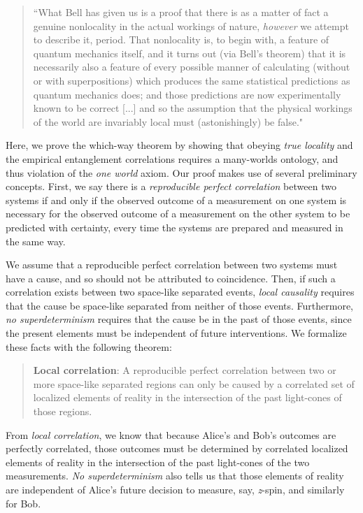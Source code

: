 \documentclass[12pt]{article}
\begin{document}
\begin{quote}
``What Bell has given us is a proof that there is as a matter of fact a genuine nonlocality in the actual workings of nature, \textit{however} we attempt to describe it, period. That nonlocality is, to begin with, a feature
of quantum mechanics itself, and it turns out (via Bell's theorem)
that it is necessarily also a feature of every possible manner of
calculating (without or with superpositions) which produces the
same statistical predictions as quantum mechanics does; and those
predictions are now experimentally known to be correct [...] and so the assumption
that the physical workings of the world are invariably local must
(astonishingly) be false." 
\end{quote}

Here, we prove the which-way theorem by showing that obeying \textit{true locality} and the empirical entanglement correlations requires a many-worlds ontology, and thus violation of the \textit{one world} axiom. Our proof makes use of several preliminary concepts.  First, we say there is a \textit{reproducible perfect correlation} between two systems if and only if the observed outcome of a measurement on one system is necessary for the observed outcome of a measurement on the other system to be predicted with certainty, every time the systems are prepared and measured in the same way.

We assume that a reproducible perfect correlation between two systems must have a cause, and so should not be attributed to coincidence.  Then, if such a correlation exists between two space-like separated events,  \textit{local causality} requires that the cause be space-like separated from neither of those events.  Furthermore, \textit{no superdeterminism} requires that the cause be in the past of those events, since the present elements must be independent of future interventions.  We formalize these facts with the following theorem:

\begin{quote}
\textbf{Local correlation}: A reproducible perfect correlation between two or more space-like separated regions can only be caused by a correlated
set of localized elements of reality in the intersection of the past light-cones of those regions.
\end{quote}


From \textit{local correlation}, we know that because Alice's and Bob's outcomes are perfectly correlated, those outcomes must be determined by correlated localized elements of reality in the intersection of the past light-cones of the two measurements.  \textit{No superdeterminism} also tells us that those elements of reality are independent of Alice's future decision to measure, say, \textit{z}-spin, and similarly for Bob. 
\end{document}
